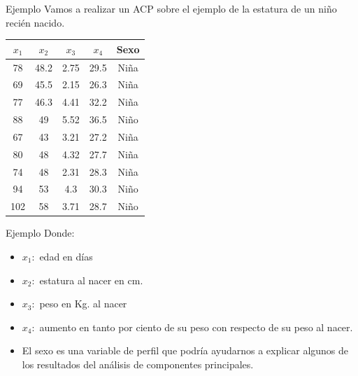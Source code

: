 \documentclass[
  ignorenonframetext,
]{beamer}
\providecommand{\tightlist}{%
  \setlength{\itemsep}{0pt}\setlength{\parskip}{0pt}}
\begin{document}
\begin{frame}{Ejemplo}
\protect\hypertarget{ejemplo}{}
Vamos a realizar un ACP sobre el ejemplo de la estatura de un niño
recién nacido.

\begin{table}
\centering
\begin{tabular}{|c|c|c|c|c|}\hline
$x_1$ & $x_2$ & $x_3$ & $x_4$&Sexo\\
\hline
78&48.2&2.75&29.5& Niña\\
69&45.5&2.15&26.3& Niña\\
77&46.3&4.41&32.2& Niña\\
88&49&5.52&36.5& Niño\\
67&43&3.21&27.2& Niña\\
80&48&4.32&27.7& Niña\\
74&48&2.31&28.3& Niña\\
94&53&4.3&30.3& Niño\\
102&58&3.71&28.7& Niño
\\
\hline
\end{tabular}
\end{table}
\end{frame}

\begin{frame}{Ejemplo}
\protect\hypertarget{ejemplo-1}{}
Donde:

\begin{itemize}
\tightlist
\item
  \(x_1:\) edad en días
\item
  \(x_2:\) estatura al nacer en cm.
\item
  \(x_3:\) peso en Kg. al nacer
\item
  \(x_4:\) aumento en tanto por ciento de su peso con respecto de su
  peso al nacer.
\item
  El sexo es una variable de perfil que podría ayudarnos a explicar
  algunos de los resultados del análisis de componentes principales.
\end{itemize}
\end{frame}
\end{document}

